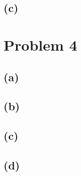 \documentclass{article}
\begin{document}
\subsection{(c)}

\section{Problem 4}
\subsection{(a)}
\subsection{(b)}
\subsection{(c)}
\subsection{(d)}
\end{document}
